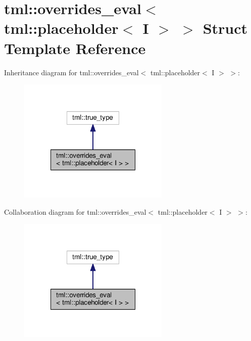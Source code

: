\hypertarget{structtml_1_1overrides__eval_3_01tml_1_1placeholder_3_01_i_01_4_01_4}{\section{tml\+:\+:overrides\+\_\+eval$<$ tml\+:\+:placeholder$<$ I $>$ $>$ Struct Template Reference}
\label{structtml_1_1overrides__eval_3_01tml_1_1placeholder_3_01_i_01_4_01_4}
}


Inheritance diagram for tml\+:\+:overrides\+\_\+eval$<$ tml\+:\+:placeholder$<$ I $>$ $>$\+:
\nopagebreak
\begin{figure}[H]
\begin{center}
\leavevmode
\includegraphics[width=204pt]{structtml_1_1overrides__eval_3_01tml_1_1placeholder_3_01_i_01_4_01_4__inherit__graph}
\end{center}
\end{figure}


Collaboration diagram for tml\+:\+:overrides\+\_\+eval$<$ tml\+:\+:placeholder$<$ I $>$ $>$\+:
\nopagebreak
\begin{figure}[H]
\begin{center}
\leavevmode
\includegraphics[width=204pt]{structtml_1_1overrides__eval_3_01tml_1_1placeholder_3_01_i_01_4_01_4__coll__graph}
\end{center}
\end{figure}
